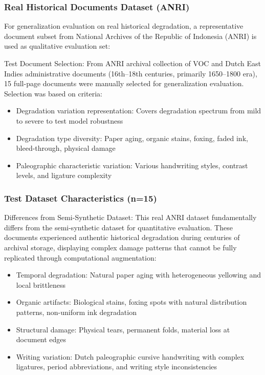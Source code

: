 \documentclass[journal]{IEEEtran}
\begin{document}
\subsubsection{Real Historical Documents Dataset (ANRI)}

For generalization evaluation on real historical degradation, a representative document subset from National Archives of the Republic of Indonesia (ANRI) is used as qualitative evaluation set:

Test Document Selection: From ANRI archival collection of VOC and Dutch East Indies administrative documents (16th--18th centuries, primarily 1650--1800 era), 15 full-page documents were manually selected for generalization evaluation. Selection was based on criteria:
\begin{itemize}
    \item Degradation variation representation: Covers degradation spectrum from mild to severe to test model robustness
    \item Degradation type diversity: Paper aging, organic stains, foxing, faded ink, bleed-through, physical damage
    \item Paleographic characteristic variation: Various handwriting styles, contrast levels, and ligature complexity
\end{itemize}

\subsubsection{Test Dataset Characteristics (n=15)}
Differences from Semi-Synthetic Dataset: This real ANRI dataset fundamentally differs from the semi-synthetic dataset for quantitative evaluation. These documents experienced authentic historical degradation during centuries of archival storage, displaying complex damage patterns that cannot be fully replicated through computational augmentation:
\begin{itemize}
    \item Temporal degradation: Natural paper aging with heterogeneous yellowing and local brittleness
    \item Organic artifacts: Biological stains, foxing spots with natural distribution patterns, non-uniform ink degradation
    \item Structural damage: Physical tears, permanent folds, material loss at document edges
    \item Writing variation: Dutch paleographic cursive handwriting with complex ligatures, period abbreviations, and writing style inconsistencies
\end{itemize}
\end{document}
